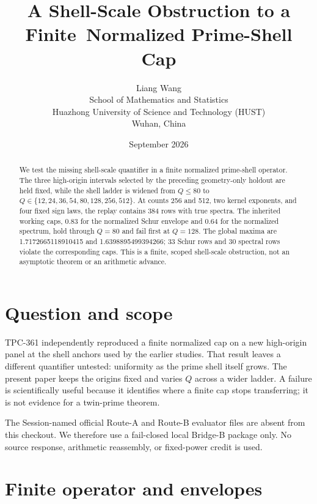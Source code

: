 \documentclass[10pt]{article}
\title{A Shell-Scale Obstruction to a Finite\
       Normalized Prime-Shell Cap}
\author{Liang Wang\\
\small School of Mathematics and Statistics\\
\small Huazhong University of Science and Technology (HUST)\\
\small Wuhan, China}
\date{September 2026}
\begin{document}
\maketitle

\begin{abstract}
We test the missing shell-scale quantifier in a finite normalized
prime-shell operator.  The three high-origin intervals selected by the
preceding geometry-only holdout are held fixed, while the shell ladder is
widened from $Q\leq80$ to
$Q\in\{12,24,36,54,80,128,256,512\}$.  At counts 256 and 512, two kernel
exponents, and four fixed sign laws, the replay contains 384 rows with true
spectra.  The inherited working caps, 0.83 for the normalized Schur envelope
and 0.64 for the normalized spectrum, hold through $Q=80$ and fail first at
$Q=128$.  The global maxima are 1.7172665118910415 and 1.6398895499394266;
33 Schur rows and 30 spectral rows violate the corresponding caps.  This is
a finite, scoped shell-scale obstruction, not an asymptotic theorem or an
arithmetic advance.
\end{abstract}

\section{Question and scope}

TPC-361 independently reproduced a finite normalized cap on a new high-origin
panel at the shell anchors used by the earlier studies.  That result leaves a
different quantifier untested: uniformity as the prime shell itself grows.
The present paper keeps the origins fixed and varies $Q$ across a wider
ladder.  A failure is scientifically useful because it identifies where a
finite cap stops transferring; it is not evidence for a twin-prime theorem.

The Session-named official Route-A and Route-B evaluator files are absent from
this checkout.  We therefore use a fail-closed local Bridge-B package only.
No source response, arithmetic reassembly, or fixed-power credit is used.

\section{Finite operator and envelopes}
\end{document}
